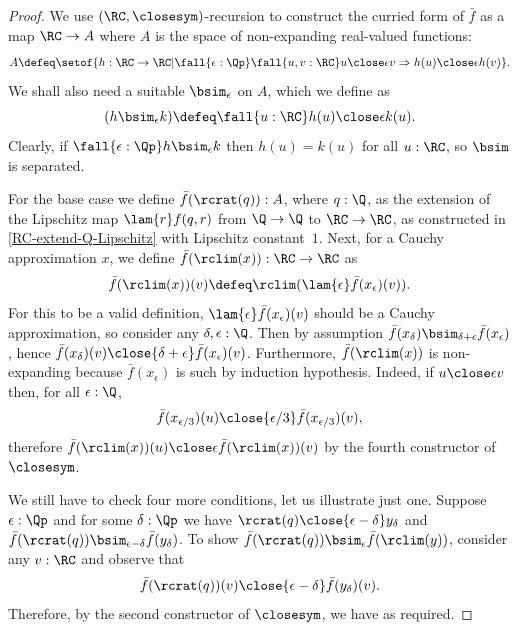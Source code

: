 \begin{proof}
  We use $(\RC, {\closesym})$-recursion to construct the curried form of $\bar{f}$ as a map
  $\RC \to A$ where $A$ is the space of non-expanding real-valued
  functions:
  \begin{equation*}
    A \defeq
    \setof{ h : \RC \to \RC |
      \fall{\epsilon : \Qp} \fall{u, v : \RC}
      u \close\epsilon v \Rightarrow h(u) \close\epsilon h(v)
    }.
  \end{equation*}
  We shall also need a suitable $\bsim_\epsilon$ on $A$, which we define as
  \begin{equation*}
    (h \bsim_\epsilon k) \defeq \fall{u : \RC} h(u) \close\epsilon k(u).
  \end{equation*}
  Clearly, if $\fall{\epsilon : \Qp} h \bsim_\epsilon k$ then $h(u) = k(u)$ for all $u :
  \RC$, so $\bsim$ is separated.

  For the base case we define $\bar{f}(\rcrat(q)) : A$, where $q : \Q$, as the
  extension of the Lipschitz map $\lam{r} f(q,r)$ from $\Q \to \Q$ to $\RC \to \RC$, as
  constructed in \cref{RC-extend-Q-Lipschitz} with Lipschitz constant~$1$. Next, for a
  Cauchy approximation $x$, we define $\bar{f}(\rclim(x)) : \RC \to \RC$ as
  \begin{equation*}
    \bar{f}(\rclim(x))(v) \defeq \rclim (\lam{\epsilon} \bar{f}(x_\epsilon)(v)).
  \end{equation*}
  For this to be a valid definition, $\lam{\epsilon} \bar{f}(x_\epsilon)(v)$ should be a
  Cauchy approximation, so consider any $\delta, \epsilon : \Q$. Then by assumption
  $\bar{f}(x_\delta) \bsim_{\delta + \epsilon} \bar{f}(x_\epsilon)$, hence
  $\bar{f}(x_\delta)(v) \close{\delta + \epsilon} \bar{f}(x_\epsilon)(v)$. Furthermore,
  $\bar{f}(\rclim(x))$ is non-expanding because $\bar{f}(x_\epsilon)$ is such by induction
  hypothesis. Indeed, if $u \close\epsilon v$ then, for all $\epsilon : \Q$,
  \begin{equation*}
    \bar{f}(x_{\epsilon/3})(u) \close{\epsilon/3} \bar{f}(x_{\epsilon/3})(v),
  \end{equation*}
  therefore $\bar{f}(\rclim(x))(u) \close\epsilon \bar{f}(\rclim(x))(v)$ by the fourth constructor of $\closesym$.

  We still have to check four more conditions, let us illustrate just one. Suppose
  $\epsilon : \Qp$ and for some $\delta : \Qp$ we have $\rcrat(q) \close{\epsilon - \delta}
  y_\delta$ and $\bar{f}(\rcrat(q)) \bsim_{\epsilon - \delta} \bar{f}(y_\delta)$. To show
  $\bar{f}(\rcrat(q)) \bsim_\epsilon \bar{f}(\rclim(y))$, consider any $v : \RC$ and observe that
  \begin{equation*}
    \bar{f}(\rcrat(q))(v) \close{\epsilon - \delta} \bar{f}(y_\delta)(v).
  \end{equation*}
  Therefore, by the second constructor of $\closesym$, we have
  as required.
\end{proof}
